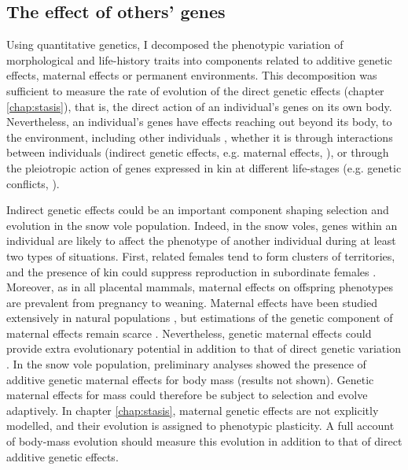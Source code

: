 \subsection{The effect of others' genes}
Using quantitative genetics, I decomposed the phenotypic variation of morphological and life-history traits into components related to additive genetic effects, maternal effects or permanent environments. This decomposition was sufficient to measure the rate of evolution of the direct genetic effects (chapter \ref{chap:stasis}), that is, the direct action of an individual's genes on its own body.
Nevertheless, an individual's genes have effects reaching out beyond its body, to the environment, including other individuals \parencite{Dawkins1982}, whether it is through interactions between individuals (indirect genetic effects, e.g. maternal effects, \cite{McAdam2014}), or through the pleiotropic action of genes expressed in kin at different life-stages (e.g. genetic conflicts, \cite{Trivers1974}).

Indirect genetic effects could be an important component shaping selection and evolution in the snow vole population. Indeed, in the snow voles, genes within an individual are likely to affect the phenotype of another individual during at least two types of situations. First, related females tend to form clusters of territories, and the presence of kin could suppress reproduction in subordinate females \parencite{Garcia-Navas2016}. Moreover, as in all placental mammals, maternal effects on offspring phenotypes are prevalent from pregnancy to weaning. 
Maternal effects have been studied extensively in natural populations \parencite{Wolf2009}, but estimations of the genetic component of maternal effects remain scarce \parencite{McAdam2014}. Nevertheless, genetic maternal effects could provide extra evolutionary potential in addition to that of direct genetic variation \parencite{Mcglothlin2014, McAdam2014, Mcfarlane2015}. In the snow vole population, preliminary analyses showed the presence of additive genetic maternal effects for body mass (results not shown). Genetic maternal effects for mass could therefore be subject to selection and evolve adaptively. In chapter \ref{chap:stasis}, maternal genetic effects are not explicitly modelled, and their evolution is assigned to phenotypic plasticity. A full account of body-mass evolution should measure this evolution in addition to that of direct additive genetic effects. 

